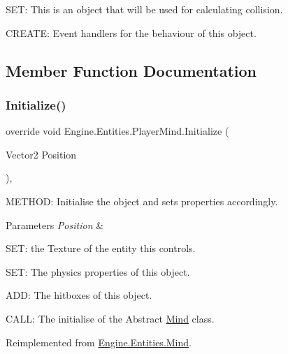 S\+ET\+: This is an object that will be used for calculating collision.

C\+R\+E\+A\+TE\+: Event handlers for the behaviour of this object. 

\subsection{Member Function Documentation}
\mbox{\label{a00326_a44a3007533c5d73810c4636fcfef5988}} 
\subsubsection{\texorpdfstring{Initialize()}{Initialize()}}
{\footnotesize\ttfamily override void Engine.\+Entities.\+Player\+Mind.\+Initialize (\begin{DoxyParamCaption}\item[{Vector2}]{Position }\end{DoxyParamCaption})\hspace{0.3cm}{\ttfamily [inline]}, {\ttfamily [virtual]}}



M\+E\+T\+H\+OD\+: Initialise the object and sets properties accordingly. 


\begin{DoxyParams}{Parameters}
{\em Position} & \\
\hline
\end{DoxyParams}
S\+ET\+: the Texture of the entity this controls.

S\+ET\+: The physics properties of this object.

A\+DD\+: The hitboxes of this object.

C\+A\+LL\+: The initialise of the Abstract \hyperlink{a00318}{Mind} class. 

Reimplemented from \hyperlink{a00318_a353d7d2bb1035aefebf0ae3e3f1d1488}{Engine.\+Entities.\+Mind}.

\mbox{\label{a00326_a008321c6a6ec30ed7ef82f13f6dc6d4e}} 
